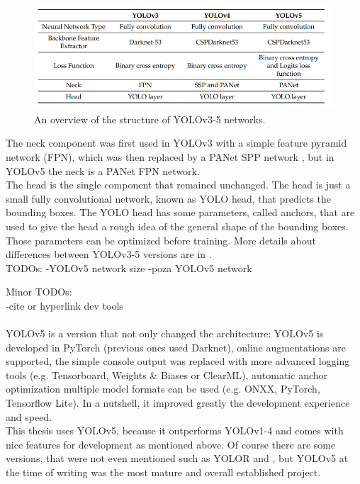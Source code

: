 \begin{figure}
\includegraphics[width=\textwidth]{images/yolo_compare}
\caption{An overview of the structure of YOLOv3-5 networks.}
\end{figure}

The neck component was first used in YOLOv3 with a simple feature pyramid network (FPN), which was then replaced by a PANet SPP network \cite{panet_paper, spp_paper}, but in YOLOv5 the neck is a PANet FPN network. \\
The head is the single component that remained unchanged. The head is just a small fully convolutional network, known as YOLO head, that predicts the bounding boxes. The YOLO head has some parameters, called anchors, that are used to give the head a rough idea of the general shape of the bounding boxes. Those parameters can be optimized before training.  More details about differences between YOLOv3-5 versions are in \cite{yolo_compare}.\\

TODOs:
-YOLOv5 network size
-poza YOLOv5 network

Minor TODOs:\\
-cite or hyperlink dev tools \\
\\
YOLOv5 is a version that not only changed the architecture: YOLOv5 is developed in PyTorch (previous ones used Darknet), online augmentations are supported, the simple console output was replaced with more advanced logging tools (e.g. Tensorboard, Weights \& Biases or ClearML), automatic anchor optimization multiple model formats can be used (e.g. ONXX, PyTorch, Tensorflow Lite). In a nutshell, it improved greatly the development experience and speed. \\
This thesis uses YOLOv5, because it outperforms YOLOv1-4 \cite{yolovx_paper} and comes with nice features for development as mentioned above. Of course there are some versions, that were not even mentioned such as YOLOR \cite{yolor_paper} and \cite{yolovx_paper}, but YOLOv5 at the time of writing was the most mature and overall established project. \\



